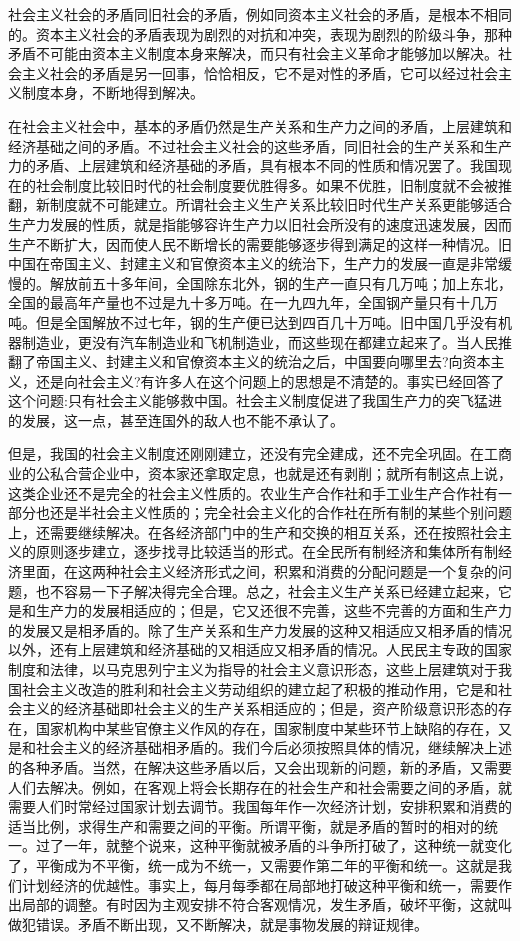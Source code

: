 \documentclass[UTF8, 12pt, a4paper]{ctexrep}
\begin{document}
社会主义社会的矛盾同旧社会的矛盾，例如同资本主义社会的矛盾，是根本不相同的。资本主义社会的矛盾表现为剧烈的对抗和冲突，表现为剧烈的阶级斗争，那种矛盾不可能由资本主义制度本身来解决，而只有社会主义革命才能够加以解决。社会主义社会的矛盾是另一回事，恰恰相反，它不是对性的矛盾，它可以经过社会主义制度本身，不断地得到解决。

在社会主义社会中，基本的矛盾仍然是生产关系和生产力之间的矛盾，上层建筑和经济基础之间的矛盾。不过社会主义社会的这些矛盾，同旧社会的生产关系和生产力的矛盾、上层建筑和经济基础的矛盾，具有根本不同的性质和情况罢了。我国现在的社会制度比较旧时代的社会制度要优胜得多。如果不优胜，旧制度就不会被推翻，新制度就不可能建立。所谓社会主义生产关系比较旧时代生产关系更能够适合生产力发展的性质，就是指能够容许生产力以旧社会所没有的速度迅速发展，因而生产不断扩大，因而使人民不断增长的需要能够逐步得到满足的这样一种情况。旧中国在帝国主义、封建主义和官僚资本主义的统治下，生产力的发展一直是非常缓慢的。解放前五十多年间，全国除东北外，钢的生产一直只有几万吨；加上东北，全国的最高年产量也不过是九十多万吨。在一九四九年，全国钢产量只有十几万吨。但是全国解放不过七年，钢的生产便已达到四百几十万吨。旧中国几乎没有机器制造业，更没有汽车制造业和飞机制造业，而这些现在都建立起来了。当人民推翻了帝国主义、封建主义和官僚资本主义的统治之后，中国要向哪里去?向资本主义，还是向社会主义?有许多人在这个问题上的思想是不清楚的。事实已经回答了这个问题:只有社会主义能够救中国。社会主义制度促进了我国生产力的突飞猛进的发展，这一点，甚至连国外的敌人也不能不承认了。

但是，我国的社会主义制度还刚刚建立，还没有完全建成，还不完全巩固。在工商业的公私合营企业中，资本家还拿取定息，也就是还有剥削；就所有制这点上说，这类企业还不是完全的社会主义性质的。农业生产合作社和手工业生产合作社有一部分也还是半社会主义性质的；完全社会主义化的合作社在所有制的某些个别问题上，还需要继续解决。在各经济部门中的生产和交换的相互关系，还在按照社会主义的原则逐步建立，逐步找寻比较适当的形式。在全民所有制经济和集体所有制经济里面，在这两种社会主义经济形式之间，积累和消费的分配问题是一个复杂的问题，也不容易一下子解决得完全合理。总之，社会主义生产关系已经建立起来，它是和生产力的发展相适应的；但是，它又还很不完善，这些不完善的方面和生产力的发展又是相矛盾的。除了生产关系和生产力发展的这种又相适应又相矛盾的情况以外，还有上层建筑和经济基础的又相适应又相矛盾的情况。人民民主专政的国家制度和法律，以马克思列宁主义为指导的社会主义意识形态，这些上层建筑对于我国社会主义改造的胜利和社会主义劳动组织的建立起了积极的推动作用，它是和社会主义的经济基础即社会主义的生产关系相适应的；但是，资产阶级意识形态的存在，国家机构中某些官僚主义作风的存在，国家制度中某些环节上缺陷的存在，又是和社会主义的经济基础相矛盾的。我们今后必须按照具体的情况，继续解决上述的各种矛盾。当然，在解决这些矛盾以后，又会出现新的问题，新的矛盾，又需要人们去解决。例如，在客观上将会长期存在的社会生产和社会需要之间的矛盾，就需要人们时常经过国家计划去调节。我国每年作一次经济计划，安排积累和消费的适当比例，求得生产和需要之间的平衡。所谓平衡，就是矛盾的暂时的相对的统一。过了一年，就整个说来，这种平衡就被矛盾的斗争所打破了，这种统一就变化了，平衡成为不平衡，统一成为不统一，又需要作第二年的平衡和统一。这就是我们计划经济的优越性。事实上，每月每季都在局部地打破这种平衡和统一，需要作出局部的调整。有时因为主观安排不符合客观情况，发生矛盾，破坏平衡，这就叫做犯错误。矛盾不断出现，又不断解决，就是事物发展的辩证规律。
\end{document}
